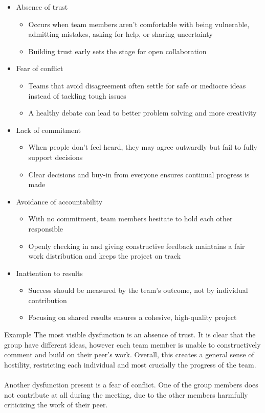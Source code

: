 \documentclass{report}
\begin{document}
		\begin{itemize}
			\item Absence of trust
				\begin{itemize}
					\item Occurs when team members aren't comfortable with being vulnerable, admitting mistakes, asking for help, or sharing uncertainty
					\item Building trust early sets the stage for open collaboration
				\end{itemize}
			\item Fear of conflict
				\begin{itemize}
					\item Teams that avoid disagreement often settle for safe or mediocre ideas instead of tackling tough issues
					\item A healthy debate can lead to better problem solving and more creativity
				\end{itemize}
			\item Lack of commitment
				\begin{itemize}
					\item When people don't feel heard, they may agree outwardly but fail to fully support decisions
					\item Clear decisions and buy-in from everyone ensures continual progress is made
				\end{itemize}
			\item Avoidance of accountability
				\begin{itemize}
					\item With no commitment, team members hesitate to hold each other responsible
					\item Openly checking in and giving constructive feedback maintains a fair work distribution and keeps the project on track
				\end{itemize}
			\item Inattention to results
				\begin{itemize}
					\item Success should be measured by the team's outcome, not by individual contribution
					\item Focusing on shared results ensures a cohesive, high-quality project
				\end{itemize}
		\end{itemize}

		\begin{question}{Example}
			The most visible dysfunction is an absence of trust. It is clear that the group have different ideas, however each team member is unable to constructively comment and build on their peer's work. Overall, this creates a general sense of hostility, restricting each individual and most crucially the progress of the team.
			\\ \\
			Another dysfunction present is a fear of conflict. One of the group members does not contribute at all during the meeting, due to the other members harmfully criticizing the work of their peer.
		\end{question}
\end{document}
